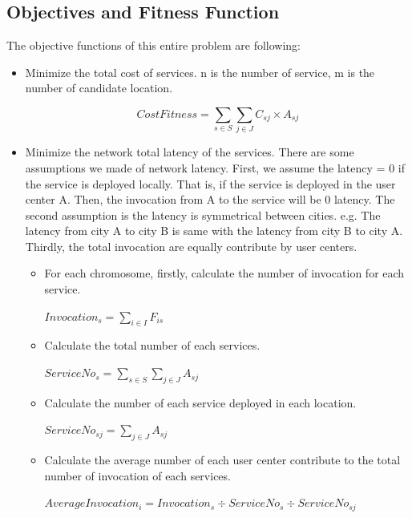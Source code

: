 \documentclass[twoside]{article}
\begin{document}
\subsection{Objectives and Fitness Function}
The objective functions of this entire problem are following:
\begin{itemize}
	\item Minimize the total cost of services. n is the number of service, m is the number of candidate location.
		\begin{center}
			\begin{equation}
				CostFitness = \sum\limits_{s \in S} \sum\limits_{j \in J} C_{sj} \times A_{sj}
			\end{equation}
		\end{center}
	\item Minimize the network total latency of the services. There are some assumptions we made of network latency. First, we assume
			the latency = 0 if the service is deployed locally. That is, if the service is deployed in the user center A. Then, the 
			invocation from A to the service will be 0 latency. The second assumption is the latency is symmetrical between cities. e.g. 
			The latency from city A to city B is same with the latency from city B to city A. Thirdly, the total invocation are equally
			contribute by user centers.
		\begin{itemize}
			\item For each chromosome, firstly, calculate the number of invocation for each service.
				\begin{center}
					$Invocation_{s} = \sum\limits_{i \in I} F_{is}$
				\end{center}
			\item Calculate the total number of each services.
				\begin{center}
					$ServiceNo_{s} = \sum\limits_{s \in S}\sum\limits_{j \in J} A_{sj}$
				\end{center}
			\item Calculate the number of each service deployed in each location.
				\begin{center}
					$ServiceNo_{sj} = \sum\limits_{j \in J} A_{sj}$
				\end{center}
			\item Calculate the average number of each user center contribute to the total number of invocation of each services.
				\begin{center}
					$AverageInvocation_{i} = Invocation_{s} \div ServiceNo_{s} \div ServiceNo_{sj}$
				\end{center}


\end{itemize}
\end{itemize}
\end{document}
